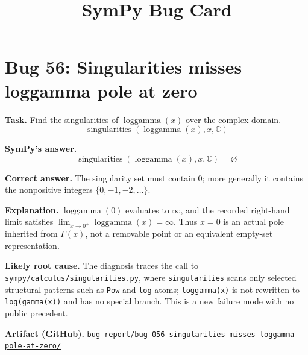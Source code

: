 \documentclass[11pt]{article}
\title{SymPy Bug Card}
\author{}
\date{}
\newcommand{\artifactrepo}{https://github.com/TODO-org/TODO-repo}
\newcommand{\bugbundle}[1]{\href{\artifactrepo/tree/main/bug-report/#1}{\nolinkurl{bug-report/#1/}}}
\begin{document}
\maketitle

\section*{Bug 56: Singularities misses loggamma pole at zero}

\begin{counterexamplebox}
\textbf{Task.} Find the singularities of \(\operatorname{loggamma}(x)\) over the
complex domain.
\[
    \operatorname{singularities}(\operatorname{loggamma}(x), x, \mathbb{C})
\]

\medskip
\textbf{SymPy's answer.}
\[
    \operatorname{singularities}(\operatorname{loggamma}(x), x, \mathbb{C})
    = \varnothing
\]

\medskip
\textbf{Correct answer.} The singularity set must contain \(0\); more generally
it contains the nonpositive integers \(\{0,-1,-2,\ldots\}\).

\medskip
\textbf{Explanation.} \(\operatorname{loggamma}(0)\) evaluates to \(\infty\),
and the recorded right-hand limit satisfies
\(\lim_{x\to 0^+}\operatorname{loggamma}(x)=\infty\). Thus \(x=0\) is an
actual pole inherited from \(\Gamma(x)\), not a removable point or an equivalent
empty-set representation.

\medskip
\textbf{Likely root cause.} The diagnosis traces the call to
\texttt{sympy/calculus/singularities.py}, where \texttt{singularities} scans
only selected structural patterns such as \texttt{Pow} and \texttt{log} atoms;
\texttt{loggamma(x)} is not rewritten to \texttt{log(gamma(x))} and has no
special branch. This is a new failure mode with no public precedent.

\medskip
\textbf{Artifact (GitHub).} \bugbundle{bug-056-singularities-misses-loggamma-pole-at-zero}
\end{counterexamplebox}
\end{document}
